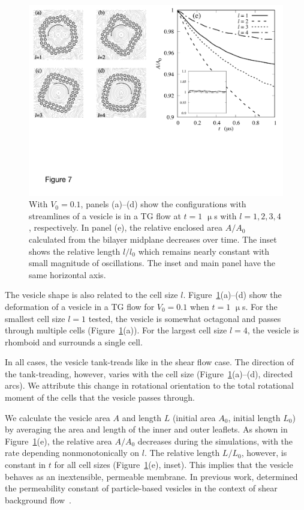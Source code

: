 \documentclass[prb,preprint,showpacs,preprintnumbers,amsmath,amssymb,longbibliography]{revtex4-1}
\begin{document}
\begin{figure}
  \begin{center}
\includegraphics[width=1.0\textwidth]{Figures/Figure7.pdf}
  \end{center}
  \vspace{-20pt}  
  \caption{\label{fig:BTG_Scale} With $V_0=0.1$, panels (a)--(d) show
  the configurations with streamlines of a vesicle is in a TG flow at
  $t=1$ $\upmu$s with $l= 1,2,3,4$, respectively. In panel (e), the
  relative enclosed area $A/A_0$ calculated from the bilayer midplane
  decreases over time. The inset shows the relative length $l/l_0$ which
  remains nearly constant with small magnitude of oscillations. The
  inset and main panel have the same horizontal axis.}
\end{figure}

The vesicle shape is also related to the cell size $l$.
Figure~\ref{fig:BTG_Scale}(a)--(d) show the deformation of a vesicle in
a TG flow for $V_0=0.1$ when $t = 1$ $\upmu$s. For the smallest cell
size $l = 1$ tested, the vesicle is somewhat octagonal and passes
through multiple cells (Figure~\ref{fig:BTG_Scale}(a)). For the largest
cell size $l = 4$, the vesicle is rhomboid and surrounds a single cell. 

In all cases, the vesicle tank-treads like in the shear flow case. The
direction of the tank-treading, however, varies with the cell size
(Figure~\ref{fig:BTG_Scale}(a)--(d), directed arcs). We attribute this
change in rotational orientation to the total rotational moment of the
cells that the vesicle passes through.

We calculate the vesicle area $A$ and length $L$ (initial area $A_0$,
initial length $L_0$) by averaging the area and length of the inner and
outer leaflets. As shown in Figure~\ref{fig:BTG_Scale}(e), the relative
area $A/A_0$ decreases during the simulations, with the rate depending
nonmonotonically on $l$. The relative length $L/L_0$, however, is
constant in $t$ for all cell sizes (Figure~\ref{fig:BTG_Scale}(e),
inset). This implies that the vesicle behaves as an inextensible,
permeable membrane. In previous work, \citet{Fu2022_JFM} determined the
permeability constant of particle-based vesicles in the context of shear
background flow~\cite{chabanon2017, qua-gan-you2021}.
\end{document}
